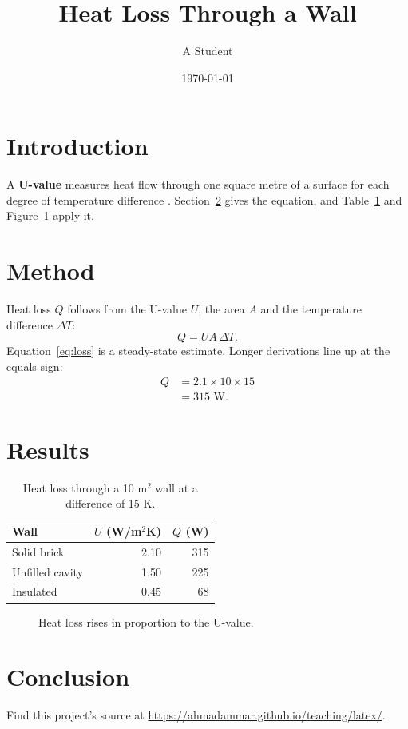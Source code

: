 \documentclass[11pt,a4paper]{article}
\title{Heat Loss Through a Wall}
\author{A Student}
\date{\today}
\newcommand{\term}[1]{\textbf{#1}}
\begin{document}
\maketitle
\tableofcontents

\section{Introduction}\label{sec:intro}
A \term{U-value} measures heat flow through one square metre of a surface for each degree of
temperature difference \citep{clarke2001}. Section~\ref{sec:method} gives the equation, and
Table~\ref{tab:walls} and Figure~\ref{fig:loss} apply it.

\section{Method}\label{sec:method}
Heat loss $Q$ follows from the U-value $U$, the area $A$ and the temperature difference $\Delta T$:
\begin{equation}
  Q = U A \, \Delta T.
  \label{eq:loss}
\end{equation}
Equation~\eqref{eq:loss} is a steady-state estimate. Longer derivations line up at the equals sign:
\begin{align}
  Q &= 2.1 \times 10 \times 15 \\
    &= 315 \text{ W}.
\end{align}

\section{Results}\label{sec:results}
\begin{table}[ht]
  \centering
  \caption{Heat loss through a 10 m$^2$ wall at a difference of 15 K.}
  \label{tab:walls}
  \begin{tabular}{lrr}
    \toprule
    Wall & $U$ (W/m$^2$K) & $Q$ (W) \\
    \midrule
    Solid brick & 2.10 & 315 \\
    Unfilled cavity & 1.50 & 225 \\
    Insulated & 0.45 & 68 \\
    \bottomrule
  \end{tabular}
\end{table}

\begin{figure}[ht]
  \centering
  \caption{Heat loss rises in proportion to the U-value.}
  \label{fig:loss}
\end{figure}

\section{Conclusion}
Find this project's source at \url{https://ahmadammar.github.io/teaching/latex/}.



\end{document}
